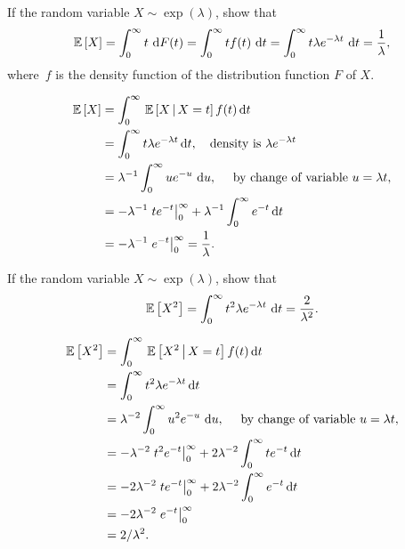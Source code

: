 \begin{question} 
  If the random variable $X\sim\exp(\lambda)$, show that
 \begin{equation*}
    \,\mathbb{E}\left[X\right] = \int_0^\infty t \,\,\text{d}F(t) = \int_0^\infty t f(t)\, \,\text{d}t =
    \int_0^\infty t \lambda e^{-\lambda t}\, \,\text{d}t = \frac{1}\lambda,
  \end{equation*}
  where~$f$ is the density function of the distribution function $F$ of $X$.
  \begin{solution}
    \begin{equation*}
      \begin{split}
\,\mathbb{E}\left[X\right] 
&= \int_0^\infty \,\mathbb{E}\left[X\,\middle|\, X=t\right] f(t) \,\text{d}t \\
&= \int_0^\infty t \lambda e^{-\lambda t} \,\text{d}t, \quad\text{density is } \lambda e^{-\lambda t} \\
&=   \lambda^{-1} \int_0^\infty u e^{-u}\, \,\text{d}u, \quad \text{ by  change of variable $u=\lambda t$},   \\
&=  -\lambda^{-1}\left. t e^{- t}\right|_0^\infty + \lambda^{-1} \int_0^\infty e^{- t} \,\text{d}t\\
&=  - \lambda^{-1} \left. e^{- t} \right|_0^\infty =  \frac1\lambda.
      \end{split}
    \end{equation*}
  \end{solution}
\end{question}

\begin{question} 
  If the random variable $X\sim\exp(\lambda)$, show that
  \begin{equation*}
  \,\mathbb{E}\left[X^2\right]= \int_0^\infty t^2 \lambda e^{-\lambda t}\, \,\text{d}t =  \frac{2}{\lambda^2}.
  \end{equation*}
  \begin{solution}
    \begin{equation*}
      \begin{split}
\,\mathbb{E}\left[X^2\right] 
&= \int_0^\infty \,\mathbb{E}\left[X^2\,\middle|\, X=t\right] f(t) \,\text{d}t \\
&= \int_0^\infty t^2 \lambda e^{-\lambda t} \,\text{d}t \\
&=   \lambda^{-2} \int_0^\infty u^2 e^{-u}\, \,\text{d}u, \quad \text{ by  change of variable $u=\lambda t$},   \\
&= -\lambda^{-2}\left. t^2 e^{- t}\right|_0^\infty + 2\lambda^{-2}\int_0^\infty t e^{- t} \,\text{d}t \\
&=  -2\lambda^{-2}\left. t e^{- t}\right|_0^\infty + 2\lambda^{-2} \int_0^\infty e^{- t} \,\text{d}t\\
&=  - 2\lambda^{-2} \left. e^{- t} \right|_0^\infty \\
&=  2/\lambda^2.
      \end{split}
    \end{equation*}
  \end{solution}
\end{question}

